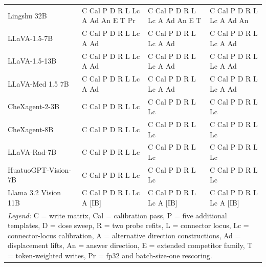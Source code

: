 \begin{table}[htbp]
\begin{tabular}{llll}
Lingshu 32B & C Cal P D R L Lc A Ad An E T Pr & C Cal P D R L Lc A Ad An E T & C Cal P D R L Lc A Ad An \\
LLaVA-1.5-7B & C Cal P D R L Lc A Ad & C Cal P D R L Lc A Ad & C Cal P D R L Lc A Ad \\
LLaVA-1.5-13B & C Cal P D R L Lc A Ad & C Cal P D R L Lc A Ad & C Cal P D R L Lc A Ad \\
LLaVA-Med 1.5 7B & C Cal P D R L Lc A Ad & C Cal P D R L Lc A Ad & C Cal P D R L Lc A Ad \\
CheXagent-2-3B & C Cal P D R L Lc & C Cal P D R L Lc & C Cal P D R L Lc \\
CheXagent-8B & C Cal P D R L Lc & C Cal P D R L Lc & C Cal P D R L Lc \\
LLaVA-Rad-7B & C Cal P D R L Lc & C Cal P D R L Lc & C Cal P D R L Lc \\
HuatuoGPT-Vision-7B & C Cal P D R L Lc & C Cal P D R L Lc & C Cal P D R L Lc \\
Llama 3.2 Vision 11B & C Cal P D R L Lc A [IB] & C Cal P D R L Lc A [IB] & C Cal P D R L Lc A [IB] \\
\midrule
\multicolumn{4}{p{0.95\textwidth}}{\textit{Legend:} C = write matrix, Cal = calibration pass, P = five additional templates, D = dose sweep, R = two probe refits, L = connector locus, Lc = connector-locus calibration, A = alternative direction constructions, Ad = displacement lifts, An = answer direction, E = extended competitor family, T = token-weighted writes, Pr = fp32 and batch-size-one rescoring.} \\
\bottomrule
\end{tabular}
\end{table}
